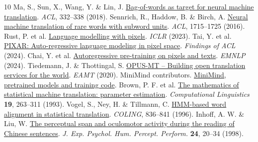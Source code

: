 \documentclass[10pt,a4paper]{article}
\begin{document}
{\footnotesize
\begin{thebibliography}{10}\setlength{\itemsep}{0pt}
 Ma, S., Sun, X., Wang, Y. \& Lin, J. \href{https://aclanthology.org/P18-2053/}{Bag-of-words as target for neural machine translation}. \textit{ACL}, 332--338 (2018).
 Sennrich, R., Haddow, B. \& Birch, A. \href{https://aclanthology.org/P16-1162/}{Neural machine translation of rare words with subword units}. \textit{ACL}, 1715--1725 (2016).
 Rust, P. et al. \href{https://arxiv.org/abs/2207.06991}{Language modelling with pixels}. \textit{ICLR} (2023).
 Tai, Y. et al. \href{https://aclanthology.org/2024.findings-acl.874/}{PIXAR: Auto-regressive language modeling in pixel space}. \textit{Findings of ACL} (2024).
 Chai, Y. et al. \href{https://aclanthology.org/2024.emnlp-main.182/}{Autoregressive pre-training on pixels and texts}. \textit{EMNLP} (2024).
 Tiedemann, J. \& Thottingal, S. \href{https://aclanthology.org/2020.eamt-1.61/}{OPUS-MT -- Building open translation services for the world}. \textit{EAMT} (2020).
 MiniMind contributors. \href{https://github.com/jingyaogong/minimind/tree/858008eb98da4428f78053a1cc4d3a3bd5973629}{MiniMind, pretrained models and training code}.
 Brown, P. F. et al. \href{https://aclanthology.org/J93-2003/}{The mathematics of statistical machine translation: parameter estimation}. \textit{Computational Linguistics} \textbf{19}, 263--311 (1993).
 Vogel, S., Ney, H. \& Tillmann, C. \href{https://aclanthology.org/C96-2141/}{HMM-based word alignment in statistical translation}. \textit{COLING}, 836--841 (1996).
 Inhoff, A. W. \& Liu, W. \href{https://pubmed.ncbi.nlm.nih.gov/9483822/}{The perceptual span and oculomotor activity during the reading of Chinese sentences}. \textit{J. Exp. Psychol. Hum. Percept. Perform.} \textbf{24}, 20--34 (1998).
\end{thebibliography}}
\end{document}
